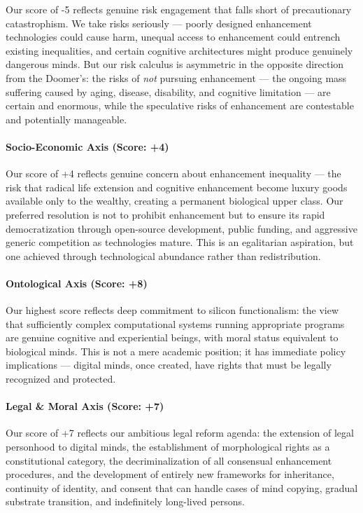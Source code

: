 Our score of -5 reflects genuine risk engagement that falls short of
precautionary catastrophism. We take risks seriously --- poorly designed
enhancement technologies could cause harm, unequal access to enhancement
could entrench existing inequalities, and certain cognitive
architectures might produce genuinely dangerous minds. But our risk
calculus is asymmetric in the opposite direction from the Doomer's: the
risks of \emph{not} pursuing enhancement --- the ongoing mass suffering
caused by aging, disease, disability, and cognitive limitation --- are
certain and enormous, while the speculative risks of enhancement are
contestable and potentially manageable.

\paragraph{Socio-Economic Axis (Score:
+4)}\label{socio-economic-axis-score-4-1}

Our score of +4 reflects genuine concern about enhancement inequality
--- the risk that radical life extension and cognitive enhancement
become luxury goods available only to the wealthy, creating a permanent
biological upper class. Our preferred resolution is not to prohibit
enhancement but to ensure its rapid democratization through open-source
development, public funding, and aggressive generic competition as
technologies mature. This is an egalitarian aspiration, but one achieved
through technological abundance rather than redistribution.

\paragraph{Ontological Axis (Score: +8)}\label{ontological-axis-score-8}

Our highest score reflects deep commitment to silicon functionalism: the
view that sufficiently complex computational systems running appropriate
programs are genuine cognitive and experiential beings, with moral
status equivalent to biological minds. This is not a mere academic
position; it has immediate policy implications --- digital minds, once
created, have rights that must be legally recognized and protected.

\paragraph{Legal \& Moral Axis (Score:
+7)}\label{legal-moral-axis-score-7-1}

Our score of +7 reflects our ambitious legal reform agenda: the
extension of legal personhood to digital minds, the establishment of
morphological rights as a constitutional category, the decriminalization
of all consensual enhancement procedures, and the development of
entirely new frameworks for inheritance, continuity of identity, and
consent that can handle cases of mind copying, gradual substrate
transition, and indefinitely long-lived persons.

